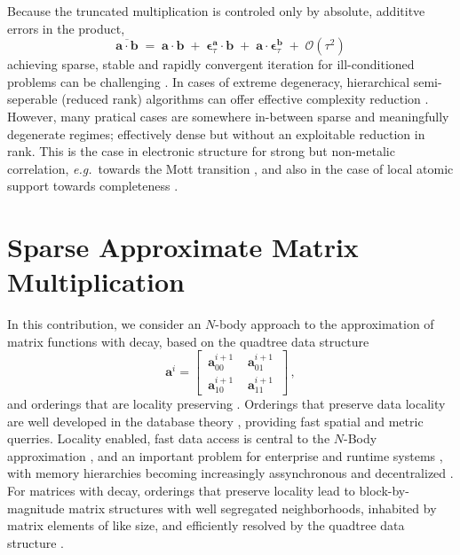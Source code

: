 \documentclass[letterpaper,twocolumn,amsmath,amsfont,amssymb,english,aps,jcp,preprintnumbers,groupaddress,nofootinbib,tightenlines]{revtex4}
\newcommand{\mat}[1]{\boldsymbol{#1}}
\begin{document}
Because the truncated multiplication is controled only by absolute, addititve errors in the  product,   
\begin{equation} \label{sparseapprox}
\overline{ \mat{a} \cdot \mat{b} }\; = \; \mat{a}\cdot\mat{b} \; +\; \mat{\epsilon}^{\mat{a}}_\tau \cdot \mat{b} \;+\;
 \mat{a} \cdot \mat{\epsilon}^{\mat{b}}_\tau  \; + \;   {\mathcal O}(\tau^2)
\end{equation}
achieving sparse, stable and rapidly convergent iteration for ill-conditioned problems can be challenging \cite{}.  In cases of 
extreme degeneracy,  hierarchical semi-seperable (reduced rank) algorithms  can offer effective complexity reduction \cite{}.
However, many pratical cases are somewhere in-between sparse and meaningfully degenerate regimes; effectively dense but without
an exploitable reduction in rank.  This is the case in electronic structure for strong but non-metalic correlation, 
{\em e.g.}~towards the Mott transition \cite{}, and also in the case of local atomic support towards completeness \cite{Others, Hutter, Gigi}. 

\pagebreak 

\section{Sparse Approximate Matrix Multiplication}


In this contribution, we consider an $N$-body approach to the approximation of matrix functions with decay, 
based on the quadtree data structure \cite{wise, samet} 
\begin{equation}
\mat{a}^i = \begin{bmatrix} \,  \mat{a}^{i+1}_{00} \, & \,  \mat{a}^{i+1}_{01} \,  \\[0.2cm]  \, \mat{a}^{i+1}_{10} \,  & \,\mat{a}^{i+1}_{11} \, \end{bmatrix} \, ,
\end{equation}
and orderings that are locality preserving \cite{}.  Orderings that preserve data locality are well developed in the
database theory \cite{}, providing fast spatial and metric querries.  
Locality enabled, fast data access is central to the $N$-Body approximation \cite{}, and an important problem 
for enterprise \cite{} and runtime systems \cite{}, with memory hierarchies becoming increasingly assynchronous and decentralized \cite{cache}.  
For matrices with decay, orderings that preserve locality lead to block-by-magnitude matrix structures with well 
segregated neighborhoods, inhabited by matrix elements of like size, and efficiently resolved by the quadtree data structure \cite{}.
\end{document}
